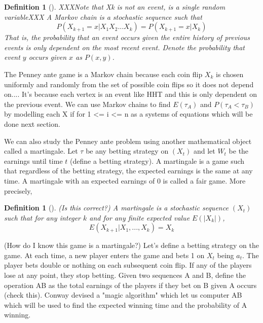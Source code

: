 \documentclass{article}
\newtheorem{definition}[theorem]{Definition}
\numberwithin{mytheorem}{subsection} %
\begin{document}
		\begin{definition}[\cite{textbook}]
			XXXNote that Xk is not an event, is a single random variableXXX A Markov chain is a stochastic sequence such that
			$$P(X_{k+1} = x | X_1X_2...X_k) = P(X_{k+1} = x  | X_k)$$
			That is, the probability that an event occurs given the entire history of
			previous events is only dependent on the most recent event. Denote the probability
			that event $y$ occurs given $x$ as $P(x,y)$.
		\end{definition}

		The Penney ante game is a Markov chain because each coin flip $X_k$ is chosen uniformly and randomly from the set of possible coin flips so it does not depend on.... It's because each vertex is an event like HHT and this is only dependent on the previous event. We can use Markov chains to find $E(\tau_A)$ and $P(\tau_A < \tau_B)$ by modelling each X if for 1 <= i <= n as a systems of equations which will be done next section. 

		We can also study the Penney ante problem using another mathematical object called a martingale. Let $\tau$ be any betting strategy on $(X_t)$ and let $W_t$ be the earnings until time $t$ (define a betting strategy). A martingale is a game such that regardless of the betting strategy, the expected earnings is the same at any time. A martingale with an expected earnings of 0 is called a fair game. More precisely,   

		\begin{definition}[\cite{li}]
			(Is this correct?) A martingale is a stochastic sequence $(X_t)$ such that for any
			integer $k$ and for any finite expected value $E(|X_k|)$, $$E(X_{k+1} | X_1, ..., X_k) = X_k$$		
		\end{definition}

		(How do I know this game is a martingale?) Let's define a betting strategy on the game. At each time, a new player enters the game and bets 1 on $X_t$ being $a_t$. The player bets double or nothing on each subsequent coin flip. If any of the players lose at any point, they stop betting. Given two sequences A and B, define the operation AB as the total earnings of the players if they bet on B given A occurs (check this). Conway devised a "magic algorithm" which let us computer AB which will be used to find the expected winning time and the probability of A winning.
\end{document}
